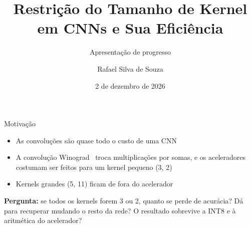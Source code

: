 \documentclass[t,aspectratio=169,12pt,xcolor=table]{beamer}
\title{Restrição do Tamanho de Kernel em CNNs e Sua Eficiência}
\subtitle{Apresentação de progresso}
\author{Rafael Silva de Souza}
\date{2 de dezembro de 2026}
\newcommand{\by}{\texttimes}
\begin{document}
\begin{frame}[plain]
  \centering\vfill
  {\inserttitle\par}
  \vspace{0.8em}{\Large\insertsubtitle\par}
  \vfill
  {\large\insertauthor\par}\vspace{0.3em}\insertdate
  \vspace{1.5em}
\end{frame}

\begin{frame}{Motivação}
  \begin{itemize}\setlength{\itemsep}{0.7em}
    \item As convoluções são quase todo o custo de uma CNN
    \item A convolução Winograd~\cite{lavin} troca multiplicações por somas, e os aceleradores costumam ser feitos para um kernel pequeno (3\by3, 2\by2)
    \item Kernels grandes (5\by5, 11\by11) ficam de fora do acelerador
  \end{itemize}
  \bigskip
  \textbf{Pergunta:} se todos os kernels forem 3\by3 ou 2\by2, quanto se perde de acurácia? Dá para recuperar mudando o resto da rede? O resultado sobrevive a INT8 e à aritmética do acelerador?
\end{frame}
\end{document}

